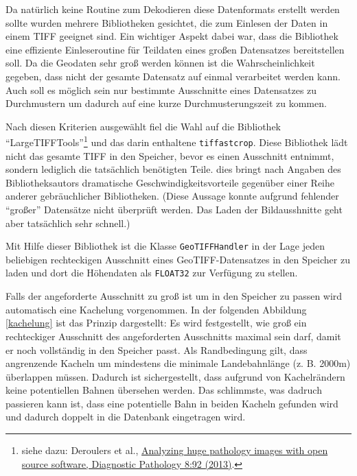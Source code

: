 \documentclass[10pt,a4paper]{report}
\begin{document}
Da natürlich keine Routine zum Dekodieren diese Datenformats erstellt werden sollte wurden mehrere Bibliotheken gesichtet, die zum Einlesen der Daten in einem TIFF geeignet sind. Ein wichtiger Aspekt dabei war, dass die Bibliothek eine effiziente Einleseroutine für Teildaten eines großen Datensatzes bereitstellen soll. Da die Geodaten sehr groß werden können ist die Wahrscheinlichkeit gegeben, dass nicht der gesamte Datensatz auf einmal verarbeitet werden kann. Auch soll es möglich sein nur bestimmte Ausschnitte eines Datensatzes zu Durchmustern um dadurch auf eine kurze Durchmusterungszeit zu kommen.

Nach diesen Kriterien ausgewählt fiel die Wahl auf die Bibliothek "`LargeTIFFTools"'\footnote{siehe dazu: Deroulers et al., \href{http://www.diagnosticpathology.org/content/8/1/92}{Analyzing huge pathology images with open source software, Diagnostic Pathology 8:92 (2013)}.} und das darin enthaltene \texttt{tiffastcrop}. Diese Bibliothek lädt nicht das gesamte TIFF in den Speicher, bevor es einen Ausschnitt entnimmt, sondern lediglich die tatsächlich benötigten Teile. dies bringt nach Angaben des Bibliotheksautors dramatische Geschwindigkeitsvorteile gegenüber einer Reihe anderer gebräuchlicher Bibliotheken. (Diese Aussage konnte aufgrund fehlender "`großer"' Datensätze nicht überprüft werden. Das Laden der Bildausshnitte geht aber tatsächlich sehr schnell.) 

Mit Hilfe dieser Bibliothek ist die Klasse \texttt{GeoTIFFHandler} in der Lage jeden beliebigen rechteckigen Ausschnitt eines GeoTIFF-Datensatzes in den Speicher zu laden und dort die Höhendaten als \texttt{FLOAT32} zur Verfügung zu stellen.

Falls der angeforderte Ausschnitt zu groß ist um in den Speicher zu passen wird automatisch eine Kachelung vorgenommen.
In der folgenden Abbildung \ref{kachelung} ist das Prinzip dargestellt: Es wird festgestellt, wie groß ein rechteckiger Ausschnitt des angeforderten Ausschnitts maximal sein darf, damit er noch vollständig in den Speicher passt. Als Randbedingung gilt, dass angrenzende Kacheln um mindestens die minimale Landebahnlänge (z. B. 2000m) überlappen müssen. Dadurch ist sichergestellt, dass aufgrund von Kachelrändern keine potentiellen Bahnen übersehen werden. Das schlimmste, was dadruch passieren kann ist, dass eine potentielle Bahn in beiden Kacheln gefunden wird und dadurch doppelt in die Datenbank eingetragen wird.
\end{document}
